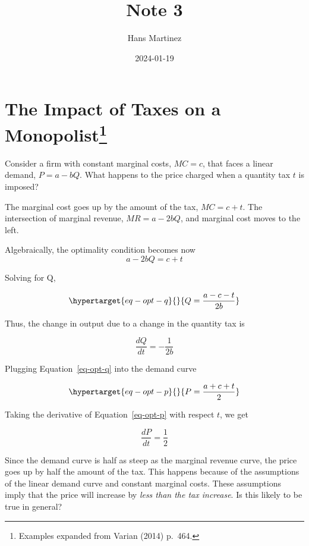 \documentclass[
]{article}
\title{Note 3}
\author{Hans Martinez}
\date{2024-01-19}
\begin{document}
\maketitle
\ifdefined\Shaded\renewenvironment{Shaded}{\begin{tcolorbox}[boxrule=0pt, interior hidden, sharp corners, breakable, enhanced, borderline west={3pt}{0pt}{shadecolor}, frame hidden]}{\end{tcolorbox}}\fi

\hypertarget{the-impact-of-taxes-on-a-monopolisttaken}{%
\section[The Impact of Taxes on a Monopolist]{\texorpdfstring{The Impact
of Taxes on a
Monopolist\footnote{Examples expanded from Varian (2014) p.~464.}}{The Impact of Taxes on a Monopolist}}\label{the-impact-of-taxes-on-a-monopolisttaken}}

Consider a firm with constant marginal costs, \(MC=c\), that faces a
linear demand, \(P=a-bQ\). What happens to the price charged when a
quantity tax \(t\) is imposed?

The marginal cost goes up by the amount of the tax, \(MC=c+t\). The
intersection of marginal revenue, \(MR=a-2bQ\), and marginal cost moves
to the left.

Algebraically, the optimality condition becomes now \[
a-2bQ=c+t
\]

Solving for Q,

\begin{equation}\protect\hypertarget{eq-opt-q}{}{
Q=\frac{a-c-t}{2b}
}\label{eq-opt-q}\end{equation}

Thus, the change in output due to a change in the quantity tax is

\[
\frac{dQ}{dt}=-\frac{1}{2b}
\]

Plugging Equation~\ref{eq-opt-q} into the demand curve

\begin{equation}\protect\hypertarget{eq-opt-p}{}{
P=\frac{a+c+t}{2}
}\label{eq-opt-p}\end{equation}

Taking the derivative of Equation~\ref{eq-opt-p} with respect \(t\), we
get

\[
\frac{dP}{dt}=\frac{1}{2}
\]

Since the demand curve is half as steep as the marginal revenue curve,
the price goes up by half the amount of the tax. This happens because of
the assumptions of the linear demand curve and constant marginal costs.
These assumptions imply that the price will increase by \emph{less than
the tax increase}. Is this likely to be true in general?
\end{document}
